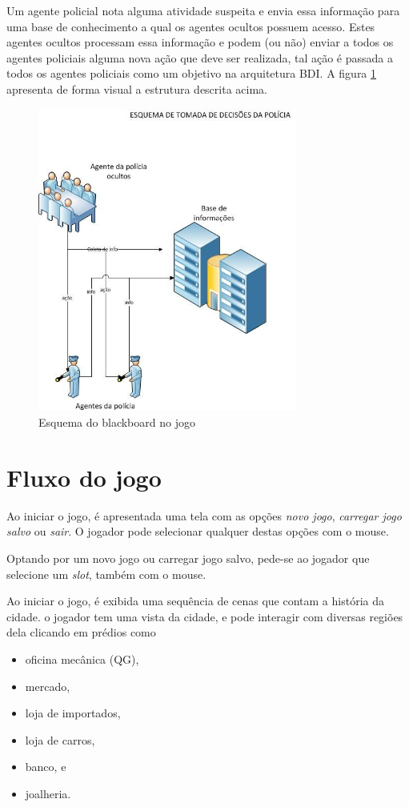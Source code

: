 Um agente policial nota alguma atividade suspeita e envia essa informação para uma base de conhecimento a qual os agentes ocultos possuem acesso. Estes agentes ocultos processam essa informação e podem (ou não) enviar a todos os agentes policiais alguma nova ação que deve ser realizada, tal ação é passada a todos os agentes policiais como um objetivo na arquitetura BDI.
A figura \ref{blackboard_policia} apresenta de forma visual a estrutura descrita acima.
\begin{figure}
\centering
\includegraphics [height=10cm]{figuras/blackboard_policia.jpg}
\caption{Esquema do blackboard no jogo}
\label{blackboard_policia}
\end{figure}

\section{Fluxo do jogo}

Ao iniciar o jogo, é apresentada uma tela com as opções \emph{novo jogo}, \emph{carregar jogo salvo} ou \emph{sair}. O jogador pode selecionar qualquer destas opções com o mouse.

Optando por um novo jogo ou carregar jogo salvo, pede-se ao jogador que selecione um \emph{slot}, também com o mouse.

Ao iniciar o jogo, é exibida uma sequência de cenas que contam a história da cidade. o jogador tem uma vista da cidade, e pode interagir com diversas regiões dela clicando em prédios como
\begin{itemize}
\item oficina mecânica (QG),
\item mercado,
\item loja de importados,
\item loja de carros,
\item banco, e
\item joalheria.
\end{itemize}

